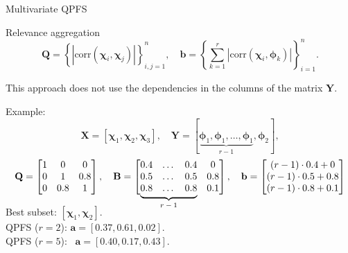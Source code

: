 \documentclass[9pt]{beamer}
\newcommand{\ba}{\mathbf{a}}
\newcommand{\bb}{\mathbf{b}}
\newcommand{\bY}{\mathbf{Y}}
\newcommand{\bX}{\mathbf{X}}
\newcommand{\bB}{\mathbf{B}}
\newcommand{\bQ}{\mathbf{Q}}
\newcommand{\bchi}{\boldsymbol{\chi}}
\newcommand{\bphi}{\boldsymbol{\phi}}
\newcommand\undermat[2]{%
	\makebox[0pt][l]{$\smash{\underbrace{\phantom{%
					\begin{matrix}#2\end{matrix}}}_{\text{$#1$}}}$}#2}
\begin{document}
\begin{frame}{Multivariate QPFS}
\begin{block}{Relevance aggregation}
\vspace{-0.3cm}
\[
\bQ = \left\{\left|\text{corr}(\bchi_i, \bchi_j)\right|\right\}_{i,j=1}^n, \quad \bb = \left\{\sum_{k=1}^r\left|\text{corr}(\bchi_i, \bphi_k)\right|\right\}_{i=1}^n.
\]
\vspace{-0.3cm}
\end{block}

This approach does not use the dependencies in the columns of the matrix $\bY$. 
\begin{block}{Example:}
\vspace{-0.5cm}
\[
\bX = [\bchi_1, \bchi_2, \bchi_3], \quad \bY = [\underbrace{\bphi_1, \bphi_1, \dots, \bphi_1}_{r-1}, \bphi_2],
\]
\vspace{-0.2cm}
\[
\bQ = \begin{bmatrix} 1 & 0 & 0\\ 0 & 1 & 0.8 \\ 0 & 0.8 & 1 \end{bmatrix}, \quad 
\bB = \begin{bmatrix} 0.4 & \dots & 0.4 & 0 \\ 0.5 & \dots & 0.5 & 0.8 \\ \undermat{r-1}{0.8 & \dots & 0.8} & 0.1 \end{bmatrix}, \quad
\bb = \begin{bmatrix} (r-1) \cdot 0.4 + 0 \\ (r-1) \cdot 0.5 + 0.8 \\ (r-1) \cdot 0.8 + 0.1 \end{bmatrix}
\]
\end{block}
\vspace{0.2cm}

Best subset: $[\bchi_1, \bchi_2]$. \\
\vspace{0.2cm}
QPFS ($r=2$): $\ba = [\mathbf{0.37},	\mathbf{0.61},	0.02]$. \\
QPFS ($r=5$): ~$\ba = [\mathbf{0.40},	0.17, \mathbf{0.43}]$. 
\end{frame}
\end{document}
